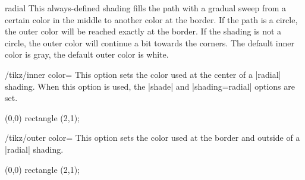 \begin{shading}{radial}
    This always-defined shading fills the path with a gradual sweep from a
    certain color in the middle to another color at the border. If the path is
    a circle, the outer color will be reached exactly at the border. If the
    shading is not a circle, the outer color will continue a bit towards the
    corners. The default inner color is gray, the default outer color is white.
    \begin{key}{/tikz/inner color=}
        This option sets the color used at the center of a |radial| shading.
        When this option is used, the |shade| and |shading=radial| options are
        set.
\begin{codeexample}[preamble={\usepgflibrary{shadings}}]
\tikz \draw[inner color=red] (0,0) rectangle (2,1);
\end{codeexample}
    \end{key}

    \begin{key}{/tikz/outer color=}
        This option sets the color used at the border and outside of a |radial|
        shading.
\begin{codeexample}[preamble={\usepgflibrary{shadings}}]
\tikz \draw[outer color=red,inner color=white]
  (0,0) rectangle (2,1);
\end{codeexample}
    \end{key}
\end{shading}


